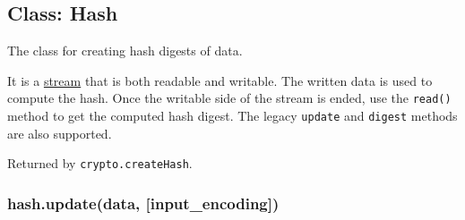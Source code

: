 \begin{Shaded}
\begin{Highlighting}[]
 \NormalTok{[}\NormalTok{];}
 \NormalTok{(}\NormalTok{);}
 \NormalTok{(}\NormalTok{);}

 \NormalTok{(}\NormalTok{);}

 
\NormalTok{(}\NormalTok{, }
\NormalTok{\});}

\NormalTok{(}\NormalTok{, }\NormalTok{() \{}
   \NormalTok{(}\NormalTok{);}
   
\NormalTok{\});}
\end{Highlighting}
\end{Shaded}

\subsection{Class: Hash}\label{class-hash}

The class for creating hash digests of data.

It is a \href{stream.html}{stream} that is both readable and writable.
The written data is used to compute the hash. Once the writable side of
the stream is ended, use the \texttt{read()} method to get the computed
hash digest. The legacy \texttt{update} and \texttt{digest} methods are
also supported.

Returned by \texttt{crypto.createHash}.

\subsubsection{hash.update(data,
{[}input\_encoding{]})}\label{hash.updatedata-inputux5fencoding}

